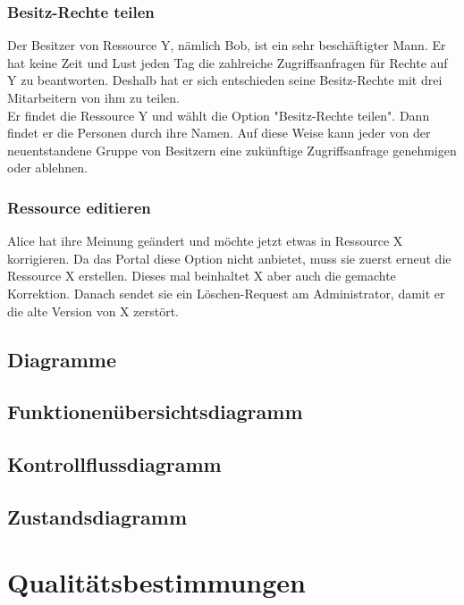 \documentclass[parskip=full,11pt]{scrartcl}
\begin{document}
\subsubsection*{Besitz-Rechte teilen}
Der Besitzer von Ressource Y, nämlich Bob, ist ein sehr beschäftigter Mann. Er hat keine Zeit und Lust jeden Tag die zahlreiche Zugriffsanfragen für Rechte auf Y zu beantworten. Deshalb hat er sich entschieden seine Besitz-Rechte mit drei Mitarbeitern von ihm zu teilen. \\
Er findet die Ressource Y und wählt die Option "Besitz-Rechte teilen". Dann findet er die Personen durch ihre Namen. Auf diese Weise kann jeder von der neuentstandene Gruppe von Besitzern eine zukünftige Zugriffsanfrage genehmigen oder ablehnen.
\subsubsection*{Ressource editieren}
Alice hat ihre Meinung geändert und möchte jetzt etwas in Ressource X korrigieren. Da das Portal diese Option nicht anbietet, muss sie zuerst erneut die Ressource X erstellen. Dieses mal beinhaltet X aber auch die gemachte Korrektion. Danach sendet sie ein Löschen-Request am Administrator, damit er die alte Version von X zerstört.
\subsection{Diagramme}
\subsection*{Funktionenübersichtsdiagramm}
\subsection*{Kontrollflussdiagramm \grqq}
\subsection*{Zustandsdiagramm \grqq}
\section{Qualitätsbestimmungen}
\end{document}
